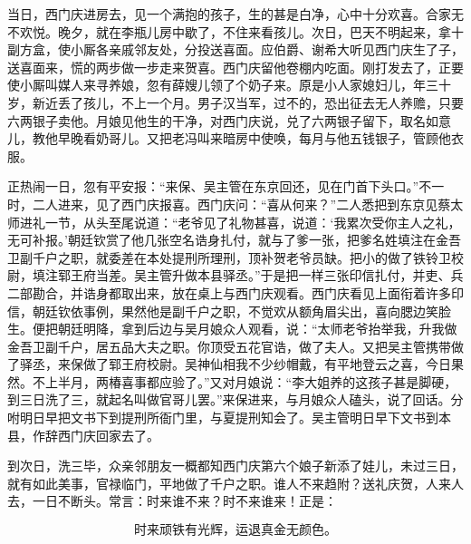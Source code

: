 当日，西门庆进房去，见一个满抱的孩子，生的甚是白净，心中十分欢喜。合家无不欢悦。晚夕，就在李瓶儿房中歇了，不住来看孩儿。次日，巴天不明起来，拿十副方盒，使小厮各亲戚邻友处，分投送喜面。应伯爵、谢希大听见西门庆生了子，送喜面来，慌的两步做一步走来贺喜。西门庆留他卷棚内吃面。刚打发去了，正要使小厮叫媒人来寻养娘，忽有薛嫂儿领了个奶子来。原是小人家媳妇儿，年三十岁，新近丢了孩儿，不上一个月。男子汉当军，过不的，恐出征去无人养赡，只要六两银子卖他。月娘见他生的干净，对西门庆说，兑了六两银子留下，取名如意儿，教他早晚看奶哥儿。又把老冯叫来暗房中使唤，每月与他五钱银子，管顾他衣服。

正热闹一日，忽有平安报：“来保、吴主管在东京回还，见在门首下头口。”不一时，二人进来，见了西门庆报喜。西门庆问：“喜从何来？”二人悉把到东京见蔡太师进礼一节，从头至尾说道：“老爷见了礼物甚喜，说道：‘我累次受你主人之礼，无可补报。’朝廷钦赏了他几张空名诰身扎付，就与了爹一张，把爹名姓填注在金吾卫副千户之职，就委差在本处提刑所理刑，顶补贺老爷员缺。把小的做了铁铃卫校尉，填注郓王府当差。吴主管升做本县驿丞。”于是把一样三张印信扎付，并吏、兵二部勘合，并诰身都取出来，放在桌上与西门庆观看。西门庆看见上面衔着许多印信，朝廷钦依事例，果然他是副千户之职，不觉欢从额角眉尖出，喜向腮边笑脸生。便把朝廷明降，拿到后边与吴月娘众人观看，说：“太师老爷抬举我，升我做金吾卫副千户，居五品大夫之职。你顶受五花官诰，做了夫人。又把吴主管携带做了驿丞，来保做了郓王府校尉。吴神仙相我不少纱帽戴，有平地登云之喜，今日果然。不上半月，两椿喜事都应验了。”又对月娘说：“李大姐养的这孩子甚是脚硬，到三日洗了三，就起名叫做官哥儿罢。”来保进来，与月娘众人磕头，说了回话。分咐明日早把文书下到提刑所衙门里，与夏提刑知会了。吴主管明日早下文书到本县，作辞西门庆回家去了。

到次日，洗三毕，众亲邻朋友一概都知西门庆第六个娘子新添了娃儿，未过三日，就有如此美事，官禄临门，平地做了千户之职。谁人不来趋附？送礼庆贺，人来人去，一日不断头。常言：时来谁不来？时不来谁来！正是：

\[
时来顽铁有光辉，运退真金无颜色。
\]
